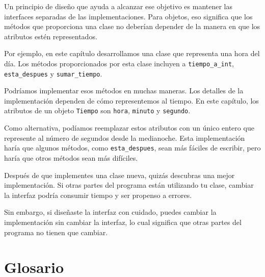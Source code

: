 \documentclass[10pt]{book}
\begin{document}
Un principio de diseño que ayuda a alcanzar ese objetivo es mantener
las interfaces separadas de las implementaciones.  Para objetos, eso significa
que los métodos que proporciona una clase no deberían depender de la manera en que los
atributos estén representados.

Por ejemplo, en este capítulo desarrollamos una clase que representa
una hora del día.  Los métodos proporcionados por esta clase incluyen a
\verb"tiempo_a_int", \verb"esta_despues" y \verb"sumar_tiempo".

Podríamos implementar esos métodos en muchas maneras.  Los detalles de la
implementación dependen de cómo representemos al tiempo.  En este capítulo, los
atributos de un objeto {\tt Tiempo} son {\tt hora}, {\tt minuto} y
{\tt segundo}.

Como alternativa, podíamos reemplazar estos atributos con
un único entero que represente al número de segundos
desde la medianoche.  Esta implementación haría que algunos métodos,
como \verb"esta_despues", sean más fáciles de escribir, pero haría que otros métodos sean
más difíciles.

Después de que implementes una clase nueva, quizás descubras una mejor
implementación.  Si otras partes del programa están utilizando tu
clase, cambiar la interfaz podría consumir tiempo y ser propenso a
errores.

Sin embargo, si diseñaste la interfaz con cuidado, puedes
cambiar la implementación sin cambiar la interfaz, lo cual
significa que otras partes del programa no tienen que cambiar.


\section{Glosario}
\end{document}

